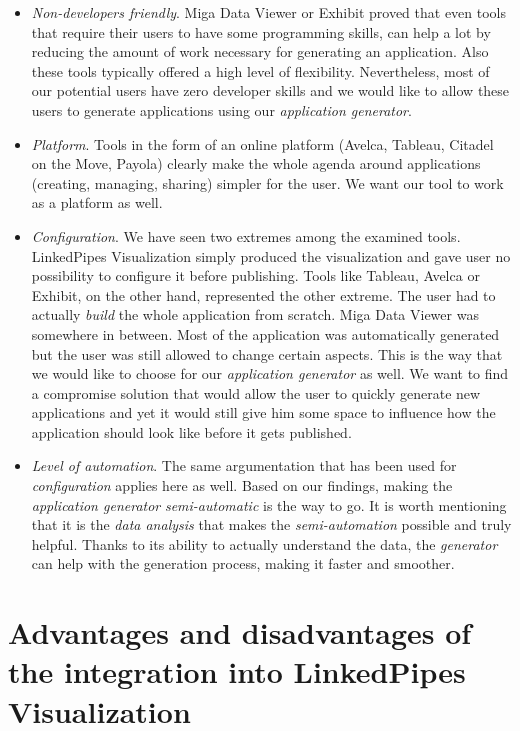 \begin{itemize}
\item \emph{Non-developers friendly}. Miga Data Viewer or Exhibit proved that even tools that require their users to have some programming skills, can help a lot by reducing the amount of work necessary for generating an application. Also these tools typically offered a high level of flexibility. Nevertheless, most of our potential users have zero developer skills and we would like to allow these users to generate applications using our \emph{application generator}.
\item \emph{Platform}. Tools in the form of an online platform (Avelca, Tableau, Citadel on the Move, Payola) clearly make the whole agenda around applications (creating, managing, sharing) simpler for the user. We want our tool to work as a platform as well.
\item \emph{Configuration}. We have seen two extremes among the examined tools. LinkedPipes Visualization simply produced the visualization and gave user no possibility to configure it before publishing. Tools like Tableau, Avelca or Exhibit, on the other hand, represented the other extreme. The user had to actually \emph{build} the whole application from scratch. Miga Data Viewer was somewhere in between. Most of the application was automatically generated but the user was still allowed to change certain aspects. This is the way that we would like to choose for our \emph{application generator} as well. We want to find a compromise solution that would allow the user to quickly generate new applications and yet it would still give him some space to influence how the application should look like before it gets published.
\item \emph{Level of automation}. The same argumentation that has been used for \emph{configuration} applies here as well. Based on our findings, making the \emph{application generator} \emph{semi-automatic} is the way to go. It is worth mentioning that it is the \emph{data analysis} that makes the \emph{semi-automation} possible and truly helpful. Thanks to its ability to actually understand the data, the \emph{generator} can help with the generation process, making it faster and smoother.
\end{itemize}

\section{Advantages and disadvantages of the integration into LinkedPipes Visualization}
\label{sec:system_proposal:integration}

